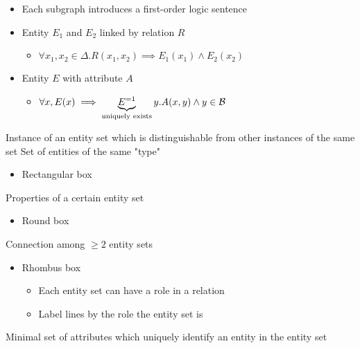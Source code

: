 \begin{itemize}
\begin{itemize}
            \item Each subgraph introduces a first-order logic sentence
            \item Entity $E_1$ and $E_2$ linked by relation $R$
                \begin{itemize}
                    \item $\forall x_1, x_2 \in \Delta. R(x_1, x_2) \implies E_1(x_1) \wedge E_2(x_2)$
                \end{itemize}
            \item Entity $E$ with attribute $A$
                \begin{itemize}
                    \item $\forall x, E(x) \implies \underbrace{E^{=1}}_{\text{uniquely exists}} y. A(x, y) \wedge y \in \mathcal{B}$
                \end{itemize}
        \end{itemize}
        \begin{itemize}
             Instance of an entity set which is distinguishable from other instances of the same set
             Set of entities of the same "type"
                \begin{itemize}
                    \item Rectangular box
                \end{itemize}
             Properties of a certain entity set
                \begin{itemize}
                    \item Round box
                \end{itemize}
             Connection among $\ge 2$ entity sets
                \begin{itemize}
                    \item Rhombus box
                        \begin{itemize}
                            \item Each entity set can have a role in a relation
                            \item Label lines by the role the entity set is
                        \end{itemize}
                \end{itemize}
             Minimal set of attributes which uniquely identify an entity in the entity set
                \begin{itemize}

\end{itemize}
\end{itemize}
\end{itemize}

